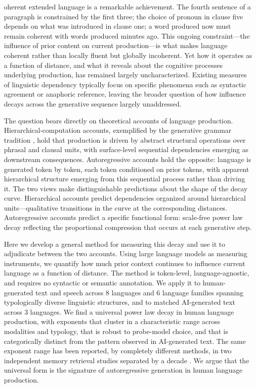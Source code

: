 \documentclass[9pt,twocolumn,twoside]{pnas-new}
\begin{document}
oherent extended language is a remarkable achievement. The fourth sentence of a paragraph is constrained by the first three; the choice of pronoun in clause five depends on what was introduced in clause one; a word produced now must remain coherent with words produced minutes ago. This ongoing constraint---the influence of prior content on current production---is what makes language coherent rather than locally fluent but globally incoherent. Yet how it operates as a function of distance, and what it reveals about the cognitive processes underlying production, has remained largely uncharacterized. Existing measures of linguistic dependency typically focus on specific phenomena such as syntactic agreement or anaphoric reference, leaving the broader question of how influence decays across the generative sequence largely unaddressed.

The question bears directly on theoretical accounts of language production. Hierarchical-computation accounts, exemplified by the generative grammar tradition \cite{chomsky1995minimalist}, hold that production is driven by abstract structural operations over phrasal and clausal units, with surface-level sequential dependencies emerging as downstream consequences. Autoregressive accounts hold the opposite: language is generated token by token, each token conditioned on prior tokens, with apparent hierarchical structure emerging from this sequential process rather than driving it. The two views make distinguishable predictions about the shape of the decay curve. Hierarchical accounts predict dependencies organized around hierarchical units---qualitative transitions in the curve at the corresponding distances. Autoregressive accounts predict a specific functional form: scale-free power law decay reflecting the proportional compression that occurs at each generative step.

Here we develop a general method for measuring this decay and use it to adjudicate between the two accounts. Using large language models as measuring instruments, we quantify how much prior context continues to influence current language as a function of distance. The method is token-level, language-agnostic, and requires no syntactic or semantic annotation. We apply it to human-generated text and speech across 8 languages and 6 language families spanning typologically diverse linguistic structures, and to matched AI-generated text across 3 languages. We find a universal power law decay in human language production, with exponents that cluster in a characteristic range across modalities and typology, that is robust to probe-model choice, and that is categorically distinct from the pattern observed in AI-generated text. The same exponent range has been reported, by completely different methods, in two independent memory retrieval studies separated by a decade \cite{anderson1991reflections,kahana2002age}. We argue that the universal form is the signature of autoregressive generation in human language production.
\end{document}
